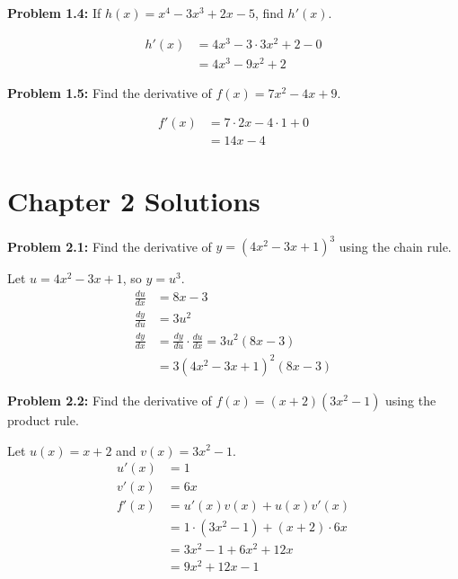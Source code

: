 \documentclass[12pt,a4paper]{book}
\theoremstyle{definition}
\begin{document}
\begin{solution}
\textbf{Problem 1.4:} If $h(x) = x^4 - 3x^3 + 2x - 5$, find $h'(x)$.

\begin{align}
h'(x) &= 4x^3 - 3 \cdot 3x^2 + 2 - 0\\
&= 4x^3 - 9x^2 + 2
\end{align}
\end{solution}

\begin{solution}
\textbf{Problem 1.5:} Find the derivative of $f(x) = 7x^2 - 4x + 9$.

\begin{align}
f'(x) &= 7 \cdot 2x - 4 \cdot 1 + 0\\
&= 14x - 4
\end{align}
\end{solution}

\section*{Chapter 2 Solutions}

\begin{solution}
\textbf{Problem 2.1:} Find the derivative of $y = (4x^2 - 3x + 1)^3$ using the chain rule.

Let $u = 4x^2 - 3x + 1$, so $y = u^3$.
\begin{align}
\frac{du}{dx} &= 8x - 3\\
\frac{dy}{du} &= 3u^2\\
\frac{dy}{dx} &= \frac{dy}{du} \cdot \frac{du}{dx} = 3u^2(8x - 3)\\
&= 3(4x^2 - 3x + 1)^2(8x - 3)
\end{align}
\end{solution}

\begin{solution}
\textbf{Problem 2.2:} Find the derivative of $f(x) = (x + 2)(3x^2 - 1)$ using the product rule.

Let $u(x) = x + 2$ and $v(x) = 3x^2 - 1$.
\begin{align}
u'(x) &= 1\\
v'(x) &= 6x\\
f'(x) &= u'(x)v(x) + u(x)v'(x)\\
&= 1 \cdot (3x^2 - 1) + (x + 2) \cdot 6x\\
&= 3x^2 - 1 + 6x^2 + 12x\\
&= 9x^2 + 12x - 1
\end{align}
\end{solution}
\end{document}

